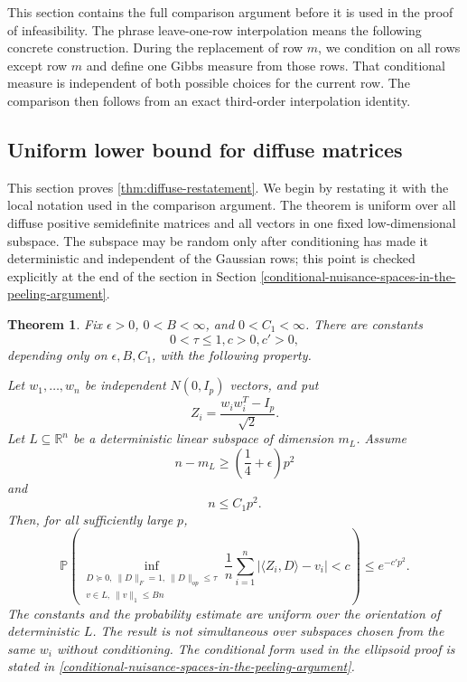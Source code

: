 \documentclass[11pt]{article}
\numberwithin{equation}{section}
\newtheorem{theorem}{Theorem}[section]
\theoremstyle{definition}
\theoremstyle{remark}
\newcommand{\Pp}{\mathbb P}
\newcommand{\1}{\boldsymbol 1}
\begin{document}
\begin{humanblock}


This section contains the full comparison argument before
it is used in the proof of infeasibility. The phrase
leave-one-row interpolation means the following concrete
construction. During the replacement of row $m$, we
condition on all rows except row $m$ and define one Gibbs
measure from those rows. That conditional measure is
independent of both possible choices for the current row.
The comparison then follows from an exact third-order
interpolation identity.

\end{humanblock}
\begin{aiblock}

\subsection{Uniform lower bound for diffuse
  matrices}\label{structured-diffuse-theorem}

This section proves \cref{thm:diffuse-restatement}. We
begin by restating it with the local notation used in the
comparison argument. The theorem is uniform over all
diffuse positive semidefinite matrices and all vectors in
one fixed low-dimensional subspace. The subspace may be
random only after conditioning has made it deterministic
and independent of the Gaussian rows; this point is checked
explicitly at the end of the section in
Section \ref{conditional-nuisance-spaces-in-the-peeling-argument}.



\begin{theorem}\label{main-theorem-10-1}
  Fix $\epsilon>0$, $0<B<\infty$, and $0<C_1<\infty$.
  There are constants
  \[
    0<\tau\le1, c>0, c'>0,
  \]
  depending only on $\epsilon,B,C_1$, with the following
  property.
  
  Let $w_1,\ldots,w_n$ be independent $N(0,I_p)$
  vectors, and put
  \[
    Z_i=\frac{w_iw_i^T-I_p}{\sqrt2}.
  \]
  Let $L\subseteq\mathbb R^n$ be a deterministic
  linear subspace of dimension $m_L$. Assume
  \[
    n-m_L\ge\left(\frac14+\epsilon\right)p^2
  \]
  and
  \[
    n\le C_1p^2.
  \]
  Then, for all sufficiently large $p$,
  \[
    \Pp\left( \inf_{\substack{D\succeq0,\ \|D\|_F=1,\
    \|D\|_{op}\le\tau\\ v\in L,\ \|v\|_1\le Bn}}
    \frac1n\sum_{i=1}^n|\langle Z_i,D\rangle-v_i|<c
    \right) \le e^{-c'p^2}.
  \]
  The constants and the probability estimate are uniform
  over the orientation of deterministic $L$. The result is
  not simultaneous over subspaces chosen from the same
  $w_i$ without conditioning. The conditional form used in
  the ellipsoid proof is stated in
  \cref{conditional-nuisance-spaces-in-the-peeling-argument}.
\end{theorem}


\end{aiblock}
\end{document}
